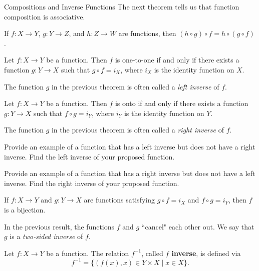 \begin{section}{Compositions and Inverse Functions}
The next theorem tells us that function composition is associative.

\begin{theorem}
If $f:X\to Y$, $g:Y\to Z$, and $h:Z\to W$ are functions, then $(h\circ g)\circ f = h\circ (g\circ f)$.
\end{theorem}

\begin{theorem}
Let $f:X\to Y$ be a function. Then $f$ is one-to-one if and only if there exists a function $g:Y\to X$ such that $g\circ f=i_X$, where $i_X$ is the identity function on $X$.
\end{theorem}

The function $g$ in the previous theorem is often called a \emph{left inverse} of $f$.

\begin{theorem}
Let $f:X\to Y$ be a function. Then $f$ is onto if and only if there exists a function $g:Y\to X$ such that $f\circ g=i_Y$, where $i_Y$ is the identity function on $Y$.
\end{theorem}

The function $g$ in the previous theorem is often called a \emph{right inverse} of $f$.

\begin{problem}
Provide an example of a function that has a left inverse but does not have a right inverse. Find the left inverse of your proposed function.
\end{problem}

\begin{problem}
Provide an example of a function that has a right inverse but does not have a left inverse. Find the right inverse of your proposed function.
\end{problem}

\begin{corollary}\label{cor:two-sided inverse}
If $f:X\to Y$ and $g:Y\to X$ are functions satisfying $g\circ f=i_X$ and  $f\circ g=i_Y$, then $f$ is a bijection.
\end{corollary}

In the previous result, the functions $f$ and $g$ ``cancel" each other out. We say that $g$ is a \emph{two-sided inverse} of $f$.

\begin{definition}
Let $f:X\to Y$ be a function.  The relation $f^{-1}$, called \textbf{$f$ inverse}, is defined via
\[
f^{-1}=\{(f(x),x)\in Y\times X\mid x\in X\}.
\]
\end{definition}


\end{section}
